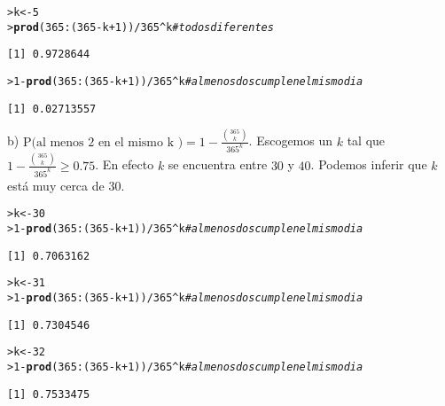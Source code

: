 \documentclass{article}\usepackage[]{graphicx}\usepackage[]{color}
\makeatletter
\newcommand{\hlnum}[1]{\textcolor[rgb]{0.686,0.059,0.569}{#1}}%
\newcommand{\hlcom}[1]{\textcolor[rgb]{0.678,0.584,0.686}{\textit{#1}}}%
\newcommand{\hlopt}[1]{\textcolor[rgb]{0,0,0}{#1}}%
\newcommand{\hlstd}[1]{\textcolor[rgb]{0.345,0.345,0.345}{#1}}%
\newcommand{\hlkwb}[1]{\textcolor[rgb]{0.69,0.353,0.396}{#1}}%
\newcommand{\hlkwd}[1]{\textcolor[rgb]{0.737,0.353,0.396}{\textbf{#1}}}%
\newenvironment{kframe}{%
 \def\at@end@of@kframe{}%
 \ifinner\ifhmode%
  \def\at@end@of@kframe{\end{minipage}}%
  \begin{minipage}{\columnwidth}%
 \fi\fi%
 \def\FrameCommand##1{\hskip\@totalleftmargin \hskip-\fboxsep
 \colorbox{shadecolor}{##1}\hskip-\fboxsep
     \hskip-\linewidth \hskip-\@totalleftmargin \hskip\columnwidth}%
 \MakeFramed {\advance\hsize-\width
   \@totalleftmargin\z@ \linewidth\hsize
   \@setminipage}}%
 {\par\unskip\endMakeFramed%
 \at@end@of@kframe}
\newenvironment{knitrout}{}{} %
\makeatother
\begin{document}
\begin{knitrout}
\color{fgcolor}\begin{kframe}
\begin{alltt}
\hlstd{> }\hlstd{k} \hlkwb{<-} \hlnum{5}
\hlstd{> }\hlkwd{prod}\hlstd{(}\hlnum{365}\hlopt{:}\hlstd{(}\hlnum{365}\hlopt{-}\hlstd{k}\hlopt{+}\hlnum{1}\hlstd{))}\hlopt{/}\hlnum{365}\hlopt{^}\hlstd{k}    \hlcom{# todos diferentes}
\end{alltt}
\begin{verbatim}
[1] 0.9728644
\end{verbatim}
\begin{alltt}
\hlstd{> }\hlnum{1} \hlopt{-}\hlkwd{prod}\hlstd{(}\hlnum{365}\hlopt{:}\hlstd{(}\hlnum{365}\hlopt{-}\hlstd{k}\hlopt{+}\hlnum{1}\hlstd{))}\hlopt{/}\hlnum{365}\hlopt{^}\hlstd{k}  \hlcom{# al menos dos cumplen el mismo dia}
\end{alltt}
\begin{verbatim}
[1] 0.02713557
\end{verbatim}
\end{kframe}
\end{knitrout}
 
b) $\mbox{P(al menos 2 en el mismo k )} = 1 -\frac{\binom{365}{k}}{365^{k}}$. Escogemos un $k$ tal que $1 -\frac{\binom{365}{k}}{365^{k}} \geq 0.75$. En efecto $k$ se encuentra entre $30$ y $40$. Podemos inferir que $k$ est\'a muy cerca de $30$. 

\begin{knitrout}
\color{fgcolor}\begin{kframe}
\begin{alltt}
\hlstd{> }\hlstd{k}\hlkwb{<-}\hlnum{30}
\hlstd{> }\hlnum{1}\hlopt{-}\hlkwd{prod}\hlstd{(}\hlnum{365}\hlopt{:}\hlstd{(}\hlnum{365}\hlopt{-}\hlstd{k}\hlopt{+}\hlnum{1}\hlstd{))}\hlopt{/}\hlnum{365}\hlopt{^}\hlstd{k}  \hlcom{# al menos dos cumplen el mismo dia}
\end{alltt}
\begin{verbatim}
[1] 0.7063162
\end{verbatim}
\begin{alltt}
\hlstd{> }\hlstd{k}\hlkwb{<-}\hlnum{31}
\hlstd{> }\hlnum{1}\hlopt{-}\hlkwd{prod}\hlstd{(}\hlnum{365}\hlopt{:}\hlstd{(}\hlnum{365}\hlopt{-}\hlstd{k}\hlopt{+}\hlnum{1}\hlstd{))}\hlopt{/}\hlnum{365}\hlopt{^}\hlstd{k}  \hlcom{# al menos dos cumplen el mismo dia}
\end{alltt}
\begin{verbatim}
[1] 0.7304546
\end{verbatim}
\begin{alltt}
\hlstd{> }\hlstd{k}\hlkwb{<-}\hlnum{32}
\hlstd{> }\hlnum{1}\hlopt{-}\hlkwd{prod}\hlstd{(}\hlnum{365}\hlopt{:}\hlstd{(}\hlnum{365}\hlopt{-}\hlstd{k}\hlopt{+}\hlnum{1}\hlstd{))}\hlopt{/}\hlnum{365}\hlopt{^}\hlstd{k}  \hlcom{# al menos dos cumplen el mismo dia}
\end{alltt}
\begin{verbatim}
[1] 0.7533475
\end{verbatim}
\end{kframe}
\end{knitrout}
\end{document}
